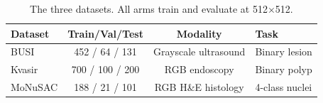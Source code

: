 
\begin{table}[t]
\centering
\begin{tabular*}{\columnwidth}{@{\extracolsep{\fill}}lccl@{}}
\hline
Dataset & Train/Val/Test & Modality & Task \\
\hline
BUSI    & 452 / 64 / 131  & Grayscale ultrasound & Binary lesion \\
Kvasir  & 700 / 100 / 200 & RGB endoscopy        & Binary polyp \\
MoNuSAC & 188 / 21 / 101  & RGB H\&E histology   & 4-class nuclei \\
\hline
\end{tabular*}
\caption{The three datasets. All arms train and evaluate at 512$\times$512.}
\label{tab:datasets}
\end{table}
